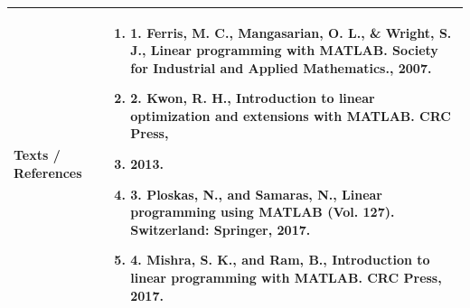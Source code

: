 \documentclass[11pt,a4paper]{article}
\begin{document}
\vspace{8pt}
\renewcommand{\arraystretch}{1.3}
\begin{tabularx}{\textwidth}{|p{3.2cm}|X|}
\hline
\textbf{Texts / References} & \begin{enumerate}[leftmargin=*,noitemsep,topsep=2pt]  \item 1. Ferris, M. C., Mangasarian, O. L., \& Wright, S. J., Linear programming with MATLAB.  Society for Industrial and Applied Mathematics., 2007.  \item 2. Kwon, R. H., Introduction to linear optimization and extensions with MATLAB. CRC Press,  \item 2013.  \item 3. Ploskas, N., and Samaras, N., Linear programming using MATLAB (Vol. 127). Switzerland:  Springer, 2017.  \item 4. Mishra, S. K., and Ram, B., Introduction to linear programming with MATLAB. CRC Press,  2017.\end{enumerate} \\
\hline
\end{tabularx}
\clearpage
\end{document}
